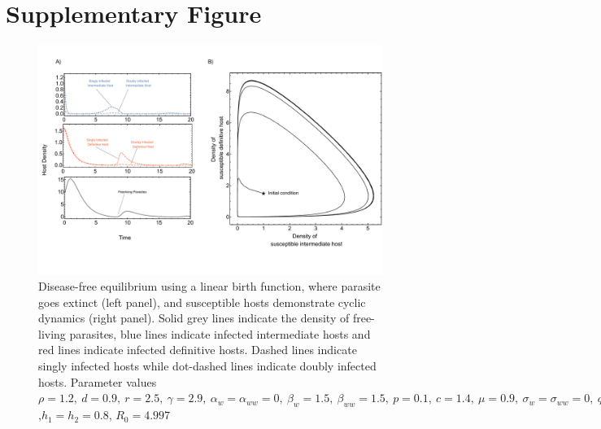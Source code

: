 \documentclass[11pt]{article}
\begin{document}
\section*{Supplementary Figure}
%
\begin{figure}[!ht]
\includegraphics[width=\textwidth]{Figures/diseasefree_linear.pdf}
\caption{Disease-free equilibrium using a linear birth function, where parasite goes extinct (left panel), and susceptible hosts demonstrate cyclic dynamics (right panel). 
Solid grey lines indicate the density of free-living parasites, blue lines indicate infected intermediate hosts and red lines indicate infected definitive hosts. 
Dashed lines indicate singly infected hosts while dot-dashed lines indicate doubly infected hosts. Parameter values  $\rho = 1.2, \  d = 0.9, \  r = 2.5, \ \gamma = 2.9, \ \alpha_w =  \alpha_{ww} =  0, \ \beta_w  = 1.5, \ \beta_{ww} = 1.5, \ p = 0.1,  \ c = 1.4, \ \mu = 0.9,  \ \sigma_w = \sigma_{ww} = 0, \ q = 0.01, \  f_w = 6.5, \  f_{ww} = 7.5, \ \delta = 0.9$,$h_1 = h_2 = 0.8$, $R_0 = 4.997$ } 
\end{figure}
\end{document}
